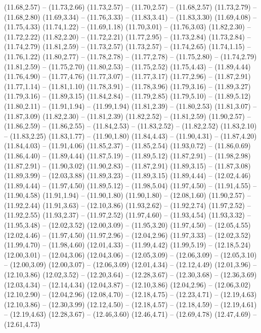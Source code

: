 {  (11.68,2.57) -- (11.73,2.66)
  (11.73,2.57) -- (11.70,2.57) -- (11.68,2.57)
  (11.73,2.79) -- (11.68,2.80)
  (11.69,3.34) -- (11.76,3.33) -- (11.83,3.41) -- (11.83,3.30)
  (11.69,4.08) -- (11.75,4.33)
  (11.74,1.22) -- (11.69,1.18)
  (11.70,3.01) -- (11.76,3.03)
  (11.82,2.30) -- (11.72,2.22)
  (11.82,2.20) -- (11.72,2.21)
  (11.77,2.95) -- (11.73,2.84)
  (11.73,2.84) -- (11.74,2.79)
  (11.81,2.59) -- (11.73,2.57)
  (11.73,2.57) -- (11.74,2.65)
  (11.74,1.15) -- (11.76,1.22)
  (11.80,2.77) -- (11.78,2.78) -- (11.77,2.78) -- (11.75,2.80) -- (11.74,2.79)
  (11.81,2.59) -- (11.75,2.70)
  (11.80,2.53) -- (11.75,2.52)
  (11.75,4.43) -- (11.89,4.44)
  (11.76,4.90) -- (11.77,4.76)
  (11.77,3.07) -- (11.77,3.17)
  (11.77,2.96) -- (11.87,2.91)
  (11.77,1.14) -- (11.81,1.10)
  (11.78,3.91) -- (11.78,3.96)
  (11.79,3.16) -- (11.89,3.27)
  (11.79,3.16) -- (11.89,3.15)
  (11.84,2.84) -- (11.79,2.85)
  (11.79,5.10) -- (11.89,5.12)
  (11.80,2.11) -- (11.91,1.94) -- (11.99,1.94)
  (11.81,2.39) -- (11.80,2.53)
  (11.81,3.07) -- (11.87,3.09)
  (11.82,2.30) -- (11.81,2.39)
  (11.82,2.52) -- (11.81,2.59)
  (11.90,2.57) -- (11.86,2.59) -- (11.86,2.55) -- (11.84,2.53) -- (11.83,2.52) -- (11.82,2.52)
  (11.83,2.10) -- (11.83,2.25)
  (11.83,1.77) -- (11.90,1.80)
  (11.84,4.43) -- (11.90,4.31) -- (11.87,4.20)
  (11.84,4.03) -- (11.91,4.06)
  (11.85,2.37) -- (11.85,2.54)
  (11.93,0.72) -- (11.86,0.69)
  (11.86,4.40) -- (11.89,4.44)
  (11.87,5.19) -- (11.89,5.12)
  (11.87,2.91) -- (11.98,2.98)
  (11.87,2.91) -- (11.90,3.02)
  (11.90,2.83) -- (11.87,2.91)
  (11.89,3.15) -- (11.87,3.08)
  (11.89,3.99) -- (12.03,3.88)
  (11.89,3.23) -- (11.89,3.15)
  (11.89,4.44) -- (12.02,4.46)
  (11.89,4.44) -- (11.97,4.50)
  (11.89,5.12) -- (11.98,5.04)
  (11.97,4.50) -- (11.91,4.55) -- (11.90,4.58)
  (11.91,1.94) -- (11.90,1.80)
  (11.90,1.80) -- (12.08,1.60)
  (11.90,2.57) -- (11.92,2.44)
  (11.91,3.63) -- (12.10,3.86)
  (11.93,2.62) -- (11.92,2.74)
  (11.97,2.52) -- (11.92,2.55)
  (11.93,2.37) -- (11.97,2.52)
  (11.97,4.60) -- (11.93,4.54)
  (11.93,3.32) -- (11.95,3.48) -- (12.02,3.52)
  (12.00,3.09) -- (11.95,3.20)
  (11.97,4.50) -- (12.05,4.55)
  (12.02,4.46) -- (11.97,4.50)
  (11.97,2.96) -- (12.04,2.96)
  (11.97,3.33) -- (12.02,3.52)
  (11.99,4.70) -- (11.98,4.60)
  (12.01,4.33) -- (11.99,4.42)
  (11.99,5.19) -- (12.18,5.24)
  (12.00,3.01) -- (12.04,3.06)
  (12.04,3.06) -- (12.05,3.09) -- (12.06,3.09) -- (12.05,3.10) -- (12.00,3.09)
  (12.00,3.07) -- (12.06,3.09)
  (12.01,4.34) -- (12.12,4.49)
  (12.01,3.96) -- (12.10,3.86)
  (12.02,3.52) -- (12.20,3.64) -- (12.28,3.67) -- (12.30,3.68) -- (12.36,3.69)
  (12.03,4.34) -- (12.14,4.34)
  (12.04,3.87) -- (12.10,3.86)
  (12.04,2.96) -- (12.06,3.02)
  (12.10,2.90) -- (12.04,2.96)
  (12.08,4.70) -- (12.18,4.75) -- (12.23,4.71) -- (12.19,4.63)
  (12.10,3.86) -- (12.30,3.99)
  (12.12,4.50) -- (12.18,4.57) -- (12.18,4.59) -- (12.19,4.61) -- (12.19,4.63)
  (12.28,3.67) -- (12.46,3.60)
  (12.46,4.71) -- (12.69,4.78)
  (12.47,4.69) -- (12.61,4.73)}

